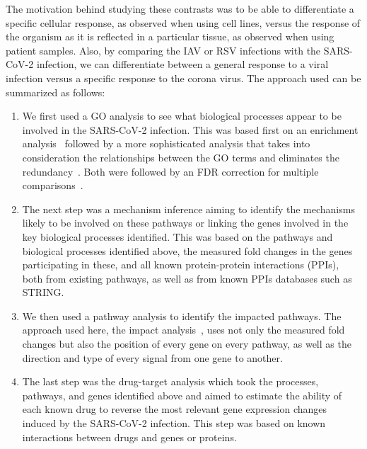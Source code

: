 The motivation behind studying these contrasts was to be able to differentiate a specific cellular response, as  observed when using cell lines, versus the response of the organism as it is reflected in a particular tissue, as observed when using  patient samples. Also, by comparing the IAV or RSV infections with the SARS-CoV-2 infection, we can differentiate between a general response to a viral infection versus a specific response to the  corona virus. 
The approach used can be summarized as follows: 
\begin{enumerate}
\item We first used a GO analysis to see what biological processes appear to be involved in the SARS-CoV-2 infection. This was based first on an enrichment analysis~\cite{Tavazoie:1999,DraghiciOE2:2003} followed by a more sophisticated analysis that takes into consideration the relationships between the GO terms and eliminates the redundancy~\cite{Alexa:2006}. Both were followed by an FDR correction for multiple comparisons~\cite{Benjamini:1995,Benjamini:2001}. 
\item The next step was a mechanism inference  aiming to identify the mechanisms likely to be involved on these pathways or linking the genes involved in the key biological processes identified. This was based on the pathways and biological processes identified above, the measured fold changes in the genes participating in these, and all known protein-protein interactions (PPIs), both from existing pathways, as well as from known PPIs databases such as STRING.

\item We then  used a pathway analysis to identify the impacted pathways. The approach used here, the impact analysis~\cite{DraghiciPE:2007,TarcaSPIA:2009}, uses not only the measured fold changes but also the position of every gene on every pathway, as well as the direction and type of every signal from one gene to another. 
\item The last step was the drug-target analysis which took the processes, pathways, and genes identified above and  aimed to estimate the ability of each known drug to reverse the most relevant gene expression changes induced by the SARS-CoV-2 infection. This step was based on known interactions between drugs and genes or proteins. 
\end{enumerate}

